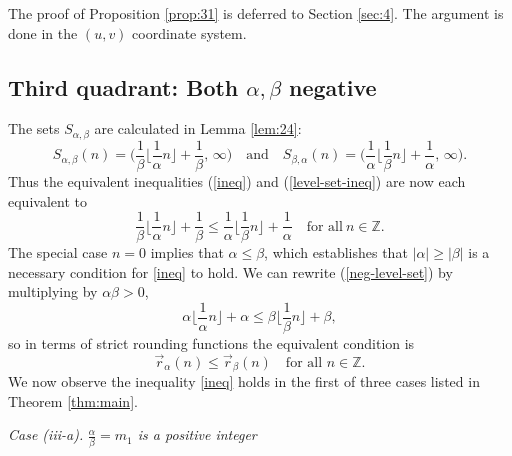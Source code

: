 \documentclass[12pt,letterpaper, reqno]{amsart}
\theoremstyle{definition}
\theoremstyle{remark}
\newcommand{\ZZ}{\ensuremath{\mathbb{Z}}}
\newcommand{\floor}[1]{\lfloor{#1}\rfloor}
\begin{document}
The  proof of Proposition \ref{prop:31} is deferred to
 Section \ref{sec:4}. 
The  argument is done in the $(u, v)$ coordinate system.


%
%
\subsection{Third quadrant: Both $\alpha, \beta$  negative}\label{sec:rounding-3quad}
The sets $S_{\alpha,\beta}$ are calculated in Lemma \ref{lem:24}:
\[ 
S_{\alpha,\beta}(n)  = \bigg( \frac{1}{\beta} \floor{\frac{1}{\alpha}n} +\frac{1}{\beta},\, \infty\bigg)
\quad\text{and}\quad
 S_{\beta,\alpha}(n) = \bigg( \frac{1}{\alpha} \floor{\frac{1}{\beta}n} +\frac 1\alpha, \,\infty \bigg).
 \]
Thus the equivalent inequalities (\ref{ineq}) and (\ref{level-set-ineq}) are now each  equivalent to 
\begin{equation}\label{neg-level-set}
\frac1\beta \floor{ \frac{1}{\alpha}n}+\frac{1}{\beta} \leq \frac{1}{\alpha} \floor{\frac{1}{\beta}n} +\frac{1}{\alpha} \quad\text{for all}\ n\in\ZZ.\end{equation}
The special case  $n=0$ implies  that  $\alpha \leq \beta$, which establishes that 
$|\alpha| \ge |\beta|$ is a necessary condition for  \eqref{ineq} to hold. 
We can rewrite (\ref{neg-level-set}) by multiplying by $\alpha\beta>0$,
\begin{equation}\label{neg-level-set2}
 \alpha\floor{\frac{1}{\alpha} n} + \alpha \leq \beta\floor{\frac{1}{\beta} n} + \beta,
 \end{equation}
so in terms of strict rounding functions the equivalent condition is
\begin{equation}\label{neg-rounding-ineq}
\vec{r}_\alpha(n) \leq \vec{r}_\beta(n) \quad\text{for all }n\in\ZZ.
\end{equation}
We now observe the inequality \eqref{ineq} holds in the first of three cases listed in Theorem \ref{thm:main}.\medskip

{\em Case {\it (iii-a)}.} {\em $\frac{\alpha}{\beta} = m_1$ is a positive integer}
\medskip
\end{document}
